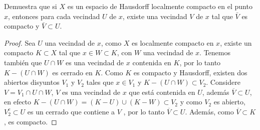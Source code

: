 
 \item Demuestra que si $X$ es un espacio de Hausdorff localmente compacto en el punto $x$, entonces para cada vecindad $U$ de $x$, existe una vecindad $V$ de $x$ tal que $\bar{V}$ es compacto y $\bar{V} \subset U$.

 \begin{proof}
     Sea $U$ una vecindad de $x$, como $X$ es localmente compacto en $x$, existe un compacto $K \subset X$ tal que $x \in W \subset K$, con $W$
     una vecindad de $x$. Tenemos también que $U \cap W$ es una vecindad de $x$ contenida en $K$, por lo tanto $K - (U \cap W)$ es cerrado en $K$. Como $K$ es compacto y Hausdorff, existen dos abiertos disyuntos $V_1$ y $V_2$ tales que $x \in V_1$ y $K - (U \cap W) \subset V_2$. Considere $V= V_1 \cap U \cap W$, $V$ es una vecindad de $x$ que está contenida en $U$, además $\overline{V} \subset U$, en efecto $K-(U \cap W)= (K-U) \cup (K-W) \subset V_2$ y como $V_2$ es abierto, $V_2^c \subset U$ es un cerrado que contiene a $V$ , por lo tanto $\overline{V} \subset U$. Además, como $\overline{V} \subset K$, es compacto. 
 \end{proof}